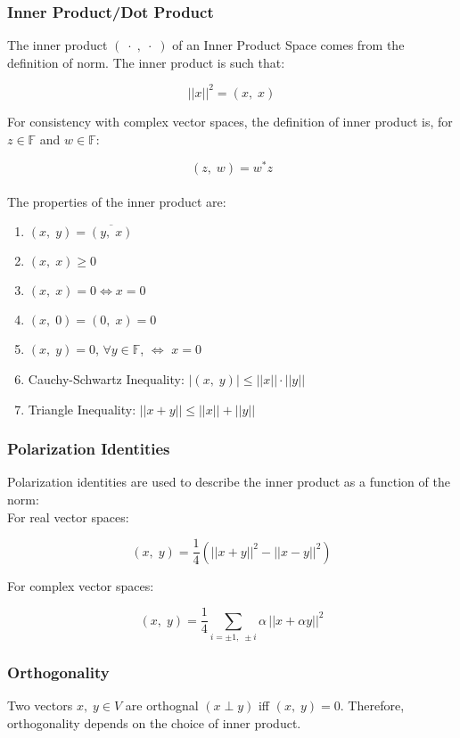 \subsubsection*{Inner Product/Dot Product}

The inner product $(\;\cdot\;,\;\cdot\;)$ of an Inner Product Space comes from the definition of norm. The inner product is such that:

$$||x||^2=(x,\;x)$$

For consistency with complex vector spaces, the definition of inner product is, for $z\in \mathbb{F}$ and $w\in \mathbb{F}$:

$$(z,\;w)=w^*z$$\\

The properties of the inner product are:
\begin{enumerate}[label=(\roman*)]
    \item $(x,\;y)=\overline{(y,\;x)}$
    \item $(x,\;x)\geq 0$
    \item $(x,\;x)=0 \Leftrightarrow x=0$
    \item $(x,\;0)=(0,\;x)=0$
    \item $(x,\;y)=0$, $\forall y\in \mathbb{F}$, $\Leftrightarrow$ $x=0$
    \item Cauchy-Schwartz Inequality: $|(x,\;y)|\leq ||x||\cdot ||y||$
    \item Triangle Inequality: $||x+y||\leq||x||+||y||$
\end{enumerate}

\subsubsection*{Polarization Identities}

Polarization identities are used to describe the inner product as a function of the norm:\\

For real vector spaces:

$$(x,\;y)=\frac14 \left(||x+y||^2-||x-y||^2\right)$$

For complex vector spaces:

$$(x,\;y)=\frac14 \sum_{i=\pm 1,\;\pm i}\alpha\,||x+\alpha y||^2$$

\subsubsection*{Orthogonality}

Two vectors $x,\;y \in V$ are orthognal $(x \perp y)$ iff $(x,\;y)=0$. Therefore, orthogonality depends on the choice of inner product.\\

